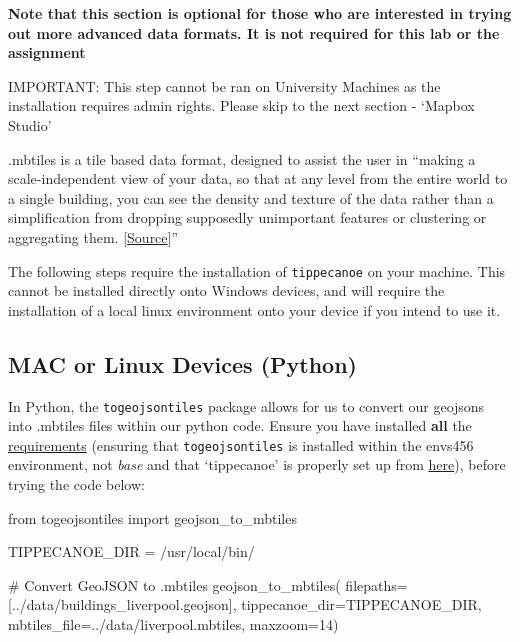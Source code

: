 \documentclass[
  letterpaper,
  DIV=11,
  numbers=noendperiod]{scrreprt}
\newenvironment{Shaded}{\begin{snugshade}}{\end{snugshade}}
\newcommand{\CommentTok}[1]{\textcolor[rgb]{0.37,0.37,0.37}{#1}}
\newcommand{\DecValTok}[1]{\textcolor[rgb]{0.68,0.00,0.00}{#1}}
\newcommand{\ImportTok}[1]{\textcolor[rgb]{0.00,0.46,0.62}{#1}}
\newcommand{\NormalTok}[1]{\textcolor[rgb]{0.00,0.23,0.31}{#1}}
\newcommand{\OperatorTok}[1]{\textcolor[rgb]{0.37,0.37,0.37}{#1}}
\newcommand{\StringTok}[1]{\textcolor[rgb]{0.13,0.47,0.30}{#1}}
\begin{document}
\textbf{Note that this section is optional for those who are interested
in trying out more advanced data formats. It is not required for this
lab or the assignment}

IMPORTANT: This step cannot be ran on University Machines as the
installation requires admin rights. Please skip to the next section -
`Mapbox Studio'

.mbtiles is a tile based data format, designed to assist the user in
``making a scale-independent view of your data, so that at any level
from the entire world to a single building, you can see the density and
texture of the data rather than a simplification from dropping
supposedly unimportant features or clustering or aggregating them.
{[}\href{https://github.com/mapbox/tippecanoe}{Source}{]}''

The following steps require the installation of \texttt{tippecanoe} on
your machine. This cannot be installed directly onto Windows devices,
and will require the installation of a local linux environment onto your
device if you intend to use it.

\subsection{MAC or Linux Devices
(Python)}\label{mac-or-linux-devices-python}

In Python, the \texttt{togeojsontiles} package allows for us to convert
our geojsons into .mbtiles files within our python code. Ensure you have
installed \textbf{all} the
\href{https://github.com/bartromgens/togeojsontiles}{requirements}
(ensuring that \texttt{togeojsontiles} is installed within the envs456
environment, not \emph{base} and that `tippecanoe' is properly set up
from \href{https://github.com/mapbox/tippecanoe}{here}), before trying
the code below:

\begin{Shaded}
\begin{Highlighting}[]
\ImportTok{from}\NormalTok{ togeojsontiles }\ImportTok{import}\NormalTok{ geojson\_to\_mbtiles}

\NormalTok{TIPPECANOE\_DIR }\OperatorTok{=} \StringTok{\textquotesingle{}/usr/local/bin/\textquotesingle{}}

\CommentTok{\# Convert GeoJSON to .mbtiles}
\NormalTok{geojson\_to\_mbtiles(}
\NormalTok{    filepaths}\OperatorTok{=}\NormalTok{[}\StringTok{\textquotesingle{}../data/buildings\_liverpool.geojson\textquotesingle{}}\NormalTok{],}
\NormalTok{    tippecanoe\_dir}\OperatorTok{=}\NormalTok{TIPPECANOE\_DIR,}
\NormalTok{    mbtiles\_file}\OperatorTok{=}\StringTok{\textquotesingle{}../data/liverpool.mbtiles\textquotesingle{}}\NormalTok{,}
\NormalTok{    maxzoom}\OperatorTok{=}\DecValTok{14}\NormalTok{)}
\end{Highlighting}
\end{Shaded}
\end{document}

